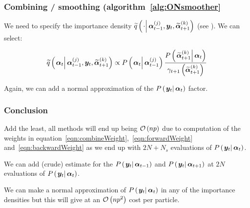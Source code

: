 \subsubsection*{Combining / smoothing (algorithm~\ref{alg:ONsmoother}}
We need to specify the importance density $\IDAproxC{\cdot}{\partic{\vec{\alpha}}{t-1}{j},\vec{y}_t, \particB{\vec{\alpha}}{t+1}{k}}$ (see \citet[page 453] {fearnhead10}). We can select:

\begin{equation}
	\IDAproxC{\vec{\alpha}_t}{\partic{\vec{\alpha}}{t-1}{j},\vec{y}_t, \particB{\vec{\alpha}}{t+1}{k}} \propto %
%
	\propC{\vec{\alpha}_t}{\partic{\vec{\alpha}}{t - 1}{j}}
	\frac{
		\propC{\particB{\vec{\alpha}}{t + 1}{k}}{\vec{\alpha}_t}
	}{
		\gamma_{t + 1}\Lparen{\particB{\vec{\alpha}}{t + 1}{k}}
	}
\end{equation}

Again, we can add a normal approximation of the $\propC{\vec{y}_t}{\vec{\alpha}_t}$ factor.

\subsubsection*{Conclusion}
Add the least, all methods will end up being $\mathcal{O}\left( np\right)$ due to computation of the weights in equation~\eqref{eqn:combineWeight},~\eqref{eqn:forwardWeight} and~\eqref{eqn:backwardWeight} as we end up with $2N + N_s$ evaluations of $\propC{\vec{y}_t}{\vec{\alpha}_t}$.

We can add (crude) estimate for the $\propC{\vec{y}_t}{\vec{\alpha}_{t - 1}}$ and $\propC{\vec{y}_t}{\vec{\alpha}_{t + 1}}$ at  $2N$ evaluations of  $\propC{\vec{y}_t}{\vec{\alpha}_t}$.

We can make a normal approximation of  $\propC{\vec{y}_t}{\vec{\alpha}_t}$ in any of the importance densities but this will give at an $\mathcal{O}\left( np^2\right)$ cost per particle.


